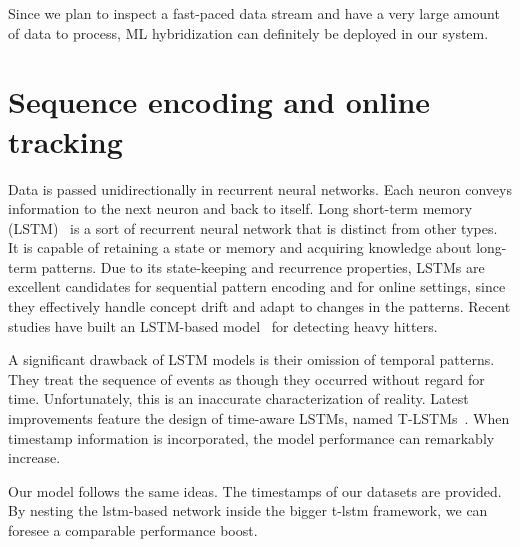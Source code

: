 Since we plan to inspect a fast-paced data stream and have a very large amount of data to process, ML hybridization can definitely be deployed in our system.

\section{Sequence encoding and online tracking}

Data is passed unidirectionally in recurrent neural networks. Each neuron conveys information to the next neuron and back to itself. Long short-term memory (LSTM)~\cite{yu2019review} is a sort of recurrent neural network that is distinct from other types. It is capable of retaining a state or memory and acquiring knowledge about long-term patterns. Due to its state-keeping and recurrence properties, LSTMs are excellent candidates for sequential pattern encoding and for online settings, since they effectively handle concept drift and adapt to changes in the patterns. Recent studies have built an LSTM-based model~\cite{hsu2019learning} for detecting heavy hitters. 

A significant drawback of LSTM models is their omission of temporal patterns. They treat the sequence of events as though they occurred without regard for time. Unfortunately, this is an inaccurate characterization of reality. Latest improvements feature the design of time-aware LSTMs, named T-LSTMs~\cite{mou2019t}. When timestamp information is incorporated, the model performance can remarkably increase.

Our model follows the same ideas. The timestamps of our datasets are provided. By nesting the lstm-based network inside the bigger t-lstm framework, we can foresee a comparable performance boost. 













